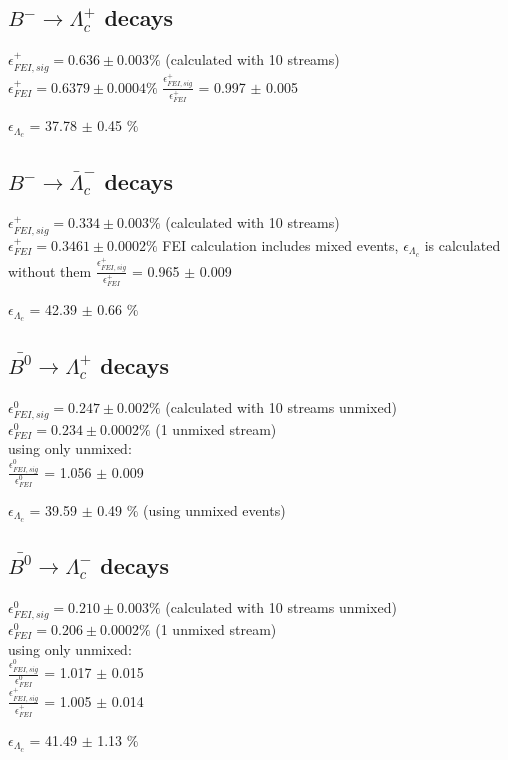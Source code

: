 \subsection{$B^- \rightarrow \Lambda_c^+$ decays}
$\epsilon^+_{FEI,sig} = 0.636 \pm 0.003\%$ (calculated with 10 streams)\\
$\epsilon^+_{FEI} = 0.6379 \pm 0.0004\%$
$\frac{\epsilon^+_{FEI,sig}}{\epsilon^+_{FEI}}$ = 0.997 $\pm $ 0.005%

$\epsilon_{\Lambda_c}$ = 37.78 $\pm $ 0.45 $\%$ %

\subsection{$B^- \rightarrow \bar{\Lambda}_c^-$ decays}
$\epsilon^+_{FEI,sig} = 0.334 \pm 0.003\%$ (calculated with 10 streams)\\
$\epsilon^+_{FEI} = 0.3461 \pm 0.0002\%$
FEI calculation includes mixed events, $\epsilon_{\Lambda_c}$ is calculated without them
$\frac{\epsilon^+_{FEI,sig}}{\epsilon^+_{FEI}}$ = 0.965 $\pm $ 0.009%

$\epsilon_{\Lambda_c}$ = 42.39 $\pm $ 0.66 $\%$ %


\subsection{$\bar{B^0} \rightarrow \Lambda_c^+$  decays}
$\epsilon^0_{FEI,sig} = 0.247 \pm 0.002\%$ (calculated with  10 streams unmixed)\\
$\epsilon^0_{FEI} = 0.234 \pm 0.0002\%$ (1 unmixed stream)\\

using only unmixed:\\
$\frac{\epsilon^0_{FEI,sig}}{\epsilon^0_{FEI}}$ = 1.056 $\pm$ 0.009%

$\epsilon_{\Lambda_c}$ = 39.59 $\pm $ 0.49 $\%$ %
 (using unmixed events)

\subsection{$\bar{B^0} \rightarrow \Lambda_c^-$  decays}
$\epsilon^0_{FEI,sig} = 0.210 \pm 0.003\%$ (calculated with  10 streams unmixed)\\
$\epsilon^0_{FEI} = 0.206 \pm 0.0002\%$ (1 unmixed stream)\\
using only unmixed:\\
$\frac{\epsilon^0_{FEI,sig}}{\epsilon^0_{FEI}}$ = 1.017 $\pm$ 0.015\\


$\frac{\epsilon^+_{FEI,sig}}{\epsilon^+_{FEI}}$ = 1.005 $\pm$ 0.014%

$\epsilon_{\Lambda_c}$ = 41.49  $\pm $ 1.13 $\%$ %